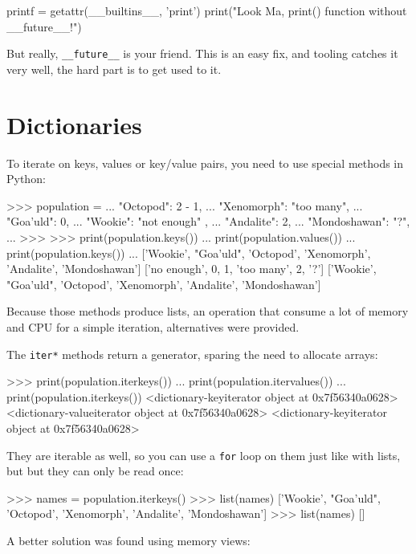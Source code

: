 \begin{py2and3}
printf = getattr(__builtins__, 'print')
print("Look Ma, print() function without __future__!")
\end{py2and3}

But really, \lstinline{__future__} is your friend. This is an easy fix, and tooling catches it very well, the hard part is to get used to it.


\section{Dictionaries}

To iterate on keys, values or key/value pairs, you need to use special methods in Python:

\begin{py2}
>>> population = {
...     "Octopod": 2 - 1,
...     "Xenomorph": "too many",
...     "Goa'uld": 0,
...     "Wookie": "not enough" ,
...     "Andalite": 2,
...     "Mondoshawan": "?",
... }
>>>
>>> print(population.keys())
... print(population.values())
... print(population.keys())
...
['Wookie', "Goa'uld", 'Octopod', 'Xenomorph', 'Andalite', 'Mondoshawan']
['no enough', 0, 1, 'too many', 2, '?']
['Wookie', "Goa'uld", 'Octopod', 'Xenomorph', 'Andalite', 'Mondoshawan']
\end{py2}

Because those methods produce lists, an operation that consume a lot of memory and CPU for a simple iteration, alternatives were provided.

The \lstinline{iter*} methods return a generator, sparing the need to allocate arrays:

\begin{py2}
>>> print(population.iterkeys())
... print(population.itervalues())
... print(population.iterkeys())
<dictionary-keyiterator object at 0x7f56340a0628>
<dictionary-valueiterator object at 0x7f56340a0628>
<dictionary-keyiterator object at 0x7f56340a0628>
\end{py2}

They are \gls{iterable} as well, so you can use a \lstinline{for} loop on them just like with lists, but but they can only be read once:

\begin{py2}
>>> names = population.iterkeys()
>>> list(names)
['Wookie', "Goa'uld", 'Octopod', 'Xenomorph', 'Andalite', 'Mondoshawan']
>>> list(names)
[]
\end{py2}

A better solution was found using memory views:

